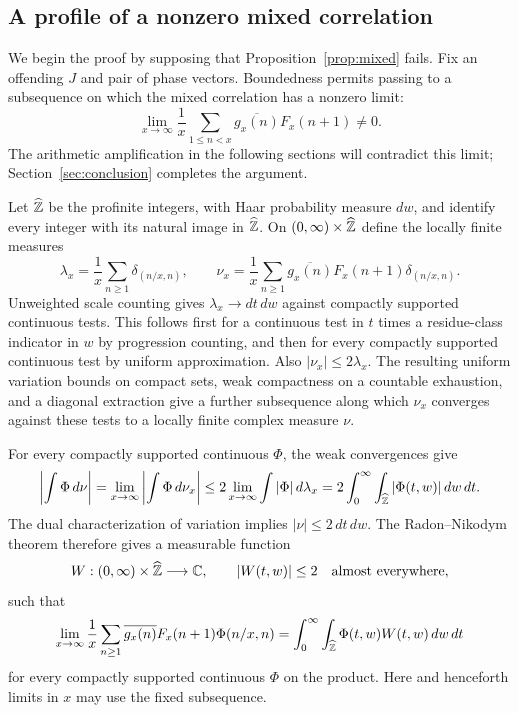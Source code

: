 \subsection{A profile of a nonzero mixed correlation}

We begin the proof by supposing that Proposition~\ref{prop:mixed} fails.
Fix an offending $J$ and pair of phase vectors.  Boundedness permits
passing to a subsequence on which the mixed correlation has a nonzero
limit:
\begin{equation}\label{eq:labels-bad-correlation}
 \lim_{x\to\infty}
  \frac1x\sum_{1\leq n<x}
                    \overline{g_x(n)}F_x(n+1)\ne0.
\end{equation}
The arithmetic amplification in the following sections will contradict
this limit; Section~\ref{sec:conclusion} completes the argument.

Let $\widehat{\mathbb Z}$ be the profinite integers, with Haar probability
measure $dw$, and identify every integer with its natural image in
$\widehat{\mathbb Z}$.  On $(0,\infty)\times\widehat{\mathbb Z}$ define the locally finite measures
\[
 \lambda_x=\frac1x\sum_{n\ge1}\delta_{(n/x,n)},\qquad
 \nu_x=\frac1x\sum_{n\ge1}
       \overline{g_x(n)}F_x(n+1)\delta_{(n/x,n)}.
\]
Unweighted scale counting gives $\lambda_x\to dt\,dw$ against compactly
supported continuous tests.  This follows first for a continuous test in $t$ times
a residue-class indicator in $w$ by progression counting, and then
for every compactly supported continuous test by uniform approximation.
Also $|\nu_x|\le2\lambda_x$.  The resulting uniform variation bounds
on compact sets, weak compactness on a countable exhaustion, and a
diagonal extraction give a further subsequence along which $\nu_x$ converges
against these tests to a locally finite complex measure $\nu$.

For every compactly supported continuous $\Phi$, the weak convergences give
\[
 \left|\int\Phi\,d\nu\right|
 =\lim_{x\to\infty}\left|\int\Phi\,d\nu_x\right|
 \le2\lim_{x\to\infty}\int|\Phi|\,d\lambda_x
 =2\int_0^\infty\int_{\widehat{\mathbb Z}}|\Phi(t,w)|\,dw\,dt.
\]
The dual characterization of variation implies $|\nu|\le2\,dt\,dw$.
The Radon--Nikodym theorem therefore gives a measurable function
\begin{equation}\label{eq:labels-profile}
 W:(0,\infty)\times\widehat{\mathbb Z}\longrightarrow\mathbb C,
 \qquad |W(t,w)|\leq2\quad\text{almost everywhere},
\end{equation}
such that
\begin{equation}\label{eq:labels-profile-convergence}
 \lim_{x\to\infty}\frac1x\sum_{n\geq1}
       \overline{g_x(n)}F_x(n+1)\Phi(n/x,n)
 =\int_0^\infty\int_{\widehat{\mathbb Z}}\Phi(t,w)W(t,w)\,dw\,dt
\end{equation}
for every compactly supported continuous $\Phi$ on the product.
Here and henceforth limits in $x$ may use the fixed subsequence.

